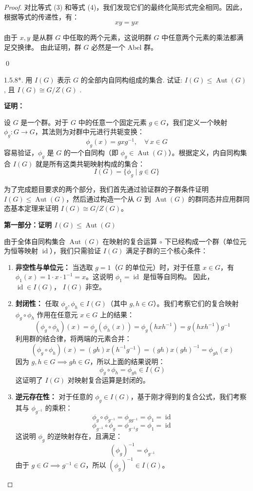\documentclass[]{article}
\begin{document}
\begin{proof}
对比等式 (3) 和等式 (4)，我们发现它们的最终化简形式完全相同。因此，根据等式的传递性，有：
\[ xy = yx \]

由于 $x, y$ 是从群 $G$ 中任取的两个元素，这说明群 $G$ 中任意两个元素的乘法都满足交换律。
由此证明，群 $G$ 必然是一个 Abel 群。

\qed

1.5.8*. 用 $I(G)$ 表示 $G$ 的全部内自同构组成的集合. 试证: $I(G) \leqslant \operatorname{Aut}(G)$ , 且 $I(G) \cong G / Z(G)$ . 

\bigskip
\noindent \textbf{证明：} 

设 $G$ 是一个群。对于 $G$ 中的任意一个固定元素 $g \in G$，我们定义一个映射 $\phi_g: G \to G$，其法则为对群中元进行共轭变换：
\[ \phi_g(x) = g x g^{-1}, \quad \forall \, x \in G \]
容易验证，$\phi_g$ 是 $G$ 的一个自同构（即 $\phi_g \in \operatorname{Aut}(G)$）。根据定义，内自同构集合 $I(G)$ 就是所有这类共轭映射构成的集合：
\[ I(G) = \{ \phi_g \mid g \in G \} \]

为了完成题目要求的两个部分，我们首先通过验证群的子群条件证明 $I(G) \leqslant \operatorname{Aut}(G)$，然后通过构造一个从 $G$ 到 $\operatorname{Aut}(G)$ 的群同态并应用群同态基本定理来证明 $I(G) \cong G / Z(G)$。

\bigskip
\noindent \textbf{第一部分：证明 $I(G) \leqslant \operatorname{Aut}(G)$}

由于全体自同构集合 $\operatorname{Aut}(G)$ 在映射的复合运算 $\circ$ 下已经构成一个群（单位元为恒等映射 $\operatorname{id}$），我们只需验证 $I(G)$ 满足子群的三个核心条件：

\begin{enumerate}
	\item \textbf{非空性与单位元：}
	当选取 $g = 1$（$G$ 的单位元）时，对于任意 $x \in G$，有 $\phi_1(x) = 1 \cdot x \cdot 1^{-1} = x$。这说明 $\phi_1 = \operatorname{id}$ 是恒等自同构。
	因此， $\operatorname{id} \in I(G)$， $I(G)$ 非空。
	
	\item \textbf{封闭性：}
	任取 $\phi_g, \phi_h \in I(G)$（其中 $g, h \in G$）。我们考察它们的复合映射 $\phi_g \circ \phi_h$ 作用在任意元 $x \in G$ 上的结果：
	\[ (\phi_g \circ \phi_h)(x) = \phi_g(\phi_h(x)) = \phi_g(h x h^{-1}) = g (h x h^{-1}) g^{-1} \]
	利用群的结合律，将两端的元素合并：
	\[ (\phi_g \circ \phi_h)(x) = (gh) x (h^{-1} g^{-1}) = (gh) x (gh)^{-1} = \phi_{gh}(x) \]
	因为 $g, h \in G \implies gh \in G$，所以上面的结果说明：
	\[ \phi_g \circ \phi_h = \phi_{gh} \in I(G) \]
	这证明了 $I(G)$ 对映射复合运算是封闭的。
	
	\item \textbf{逆元存在性：}
	对于任意的 $\phi_g \in I(G)$，基于刚才得到的复合公式，我们考察其与 $\phi_{g^{-1}}$ 的乘积：
	\[ \phi_g \circ \phi_{g^{-1}} = \phi_{g g^{-1}} = \phi_1 = \operatorname{id} \]
	\[ \phi_{g^{-1}} \circ \phi_g = \phi_{g^{-1} g} = \phi_1 = \operatorname{id} \]
	这说明 $\phi_g$ 的逆映射存在，且满足：
	\[ (\phi_g)^{-1} = \phi_{g^{-1}} \]
	由于 $g \in G \implies g^{-1} \in G$，所以 $(\phi_g)^{-1} \in I(G)$。
\end{enumerate}


\end{proof}
\end{document}
